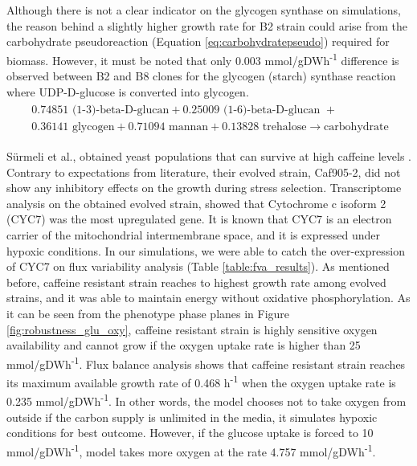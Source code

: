 Although there is not a clear indicator on the glycogen synthase on simulations, the reason behind a slightly higher growth rate for B2 strain could arise from the carbohydrate pseudoreaction (Equation \ref{eq:carbohydratepseudo}) required for biomass. However, it must be noted that only 0.003 mmol/gDWh\textsuperscript{-1} difference is observed between B2 and B8 clones for the glycogen (starch) synthase reaction where UDP-D-glucose is converted into glycogen.
\begin{align}
\begin{split}
\label{eq:carbohydratepseudo}
\  0.74851 \text{ (1-3)-beta-D-glucan} + 0.25009 \text{ (1-6)-beta-D-glucan } + \\
\ 0.36141 \text{ glycogen} + 0.71094 \text{ mannan} + 0.13828 \text{ trehalose} \xrightarrow{}  \text{carbohydrate}
\end{split}
\end{align}

Sürmeli et al., obtained yeast populations that can survive at high caffeine levels \cite{Srmeli2019}. Contrary to expectations from literature, their evolved strain, Caf905-2, did not show any inhibitory effects on the growth during stress selection. Transcriptome analysis on the obtained evolved strain, showed that Cytochrome c isoform 2 (CYC7) was the most upregulated gene. It is known that CYC7 is an electron carrier of the mitochondrial intermembrane space, and it is expressed under hypoxic conditions. In our simulations, we were able to catch the over-expression of CYC7 on flux variability analysis (Table \ref{table:fva_results}). As mentioned before, caffeine resistant strain reaches to highest growth rate among evolved strains, and it was able to maintain energy without oxidative phosphorylation. As it can be seen from the phenotype phase planes in Figure \ref{fig:robustness_glu_oxy}, caffeine resistant strain is highly sensitive oxygen availability and cannot grow if the oxygen uptake rate is higher than 25 mmol/gDWh\textsuperscript{-1}. Flux balance analysis shows that caffeine resistant strain reaches its maximum available growth rate of 0.468 h\textsuperscript{-1} when the oxygen uptake rate is 0.235 mmol/gDWh\textsuperscript{-1}. In other words, the model chooses not to take oxygen from outside if the carbon supply is unlimited in the media, it simulates hypoxic conditions for best outcome. However, if the glucose uptake is forced to 10 mmol/gDWh\textsuperscript{-1}, model takes more oxygen at the rate 4.757 mmol/gDWh\textsuperscript{-1}.

